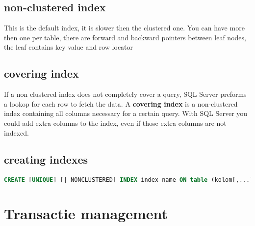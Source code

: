 \documentclass{report}
\begin{document}
	\section{non-clustered index}
	This is the default index, it is slower then the clustered one. You can have more then one per table, there are forward and backward pointers between leaf nodes, the leaf contains key value and row locator
	\section{covering index}
	If a non clustered index does not completely cover a query, SQL Server preforms a lookop for each row to fetch the data. A \textbf{covering index} is a non-clustered index containing all columns necessary for a certain query. With SQL Server you could add extra columns to the index, even if those extra columns are not indexed. 
	\section{creating indexes}
	\begin{lstlisting}[language = sql]
	CREATE [UNIQUE] [| NONCLUSTERED] INDEX index_name ON table (kolom[,...])\end{lstlisting}
	
	\chapter{Transactie management}
\end{document}
